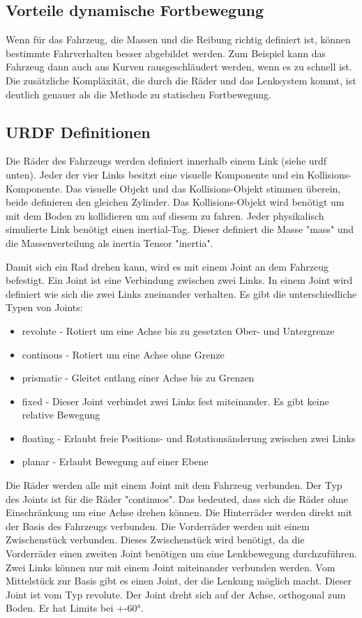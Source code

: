 \subsection*{Vorteile dynamische Fortbewegung}
Wenn für das Fahrzeug, die Massen und die Reibung richtig definiert ist, können bestimmte Fahrverhalten besser abgebildet werden.
Zum Beispiel kann das Fahrzeug dann auch aus Kurven rausgeschläudert werden, wenn es zu schnell ist.
Die zusätzliche Kompläxität, die durch die Räder und das Lenksystem kommt, ist deutlich genauer als die Methode zu statischen Fortbewegung.

\subsection*{URDF Definitionen}
Die Räder des Fahrzeugs werden definiert innerhalb einem Link (siehe urdf unten).
Jeder der vier Links besitzt eine visuelle Komponente und ein Kollisions-Komponente.
Das visuelle Objekt und das Kollisions-Objekt stimmen überein, beide definieren den gleichen Zylinder.
Das Kollisions-Objekt wird benötigt um mit dem Boden zu kollidieren um auf diesem zu fahren.
Jeder physikalisch simulierte Link benötigt einen inertial-Tag.
Dieser definiert die Masse "mass" und die Massenverteilung als inertia Tensor "inertia".

Damit sich ein Rad drehen kann, wird es mit einem Joint an dem Fahrzeug befestigt.
Ein Joint ist eine Verbindung zwischen zwei Links. 
In einem Joint wird definiert wie sich die zwei Links zueinander verhalten.
Es gibt die unterschiedliche Typen von Joints:
\begin{itemize}
    \item revolute - Rotiert um eine Achse bis zu gesetzten Ober- und Untergrenze
    \item continous - Rotiert um eine Achse ohne Grenze
    \item prismatic - Gleitet entlang einer Achse bis zu Grenzen
    \item fixed - Dieser Joint verbindet zwei Links fest miteinander. Es gibt keine relative Bewegung
    \item floating - Erlaubt freie Positions- und Rotationsänderung zwischen zwei Links
    \item planar - Erlaubt Bewegung auf einer Ebene
\end{itemize}
\cite{Joint}
Die Räder werden alle mit einem Joint mit dem Fahrzeug verbunden.
Der Typ des Joints ist für die Räder "continuos". Das bedeuted, dass sich die Räder ohne Einschränkung um eine Achse drehen können.
Die Hinterräder werden direkt mit der Basis des Fahrzeugs verbunden.
Die Vorderräder werden mit einem Zwischenstück verbunden.
Dieses Zwischenstück wird benötigt, da die Vorderräder einen zweiten Joint benötigen um eine Lenkbewegung durchzuführen.
Zwei Links können nur mit einem Joint miteinander verbunden werden.
Vom Mittelstück zur Basis gibt es einen Joint, der die Lenkung möglich macht.
Dieser Joint ist vom Typ revolute. 
Der Joint dreht sich auf der Achse, orthogonal zum Boden.
Er hat Limits bei +-60°. 

